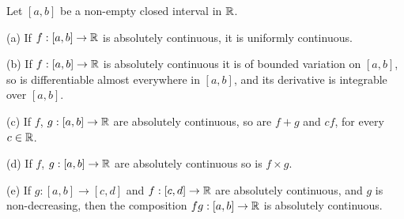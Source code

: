  Let $[a,b]$ be a non-empty closed interval in
$\Bbb R$.

(a) If $f:[a,b]\to\Bbb R$ is absolutely continuous, it is uniformly
continuous.

(b) If $f:[a,b]\to\Bbb R$ is absolutely continuous it is of bounded
variation on $[a,b]$, so is differentiable almost everywhere in $[a,b]$,
and its derivative is integrable over $[a,b]$.

(c) If $f$, $g:[a,b]\to\Bbb R$ are absolutely continuous, so are
$f+g$ and $cf$, for every $c\in\Bbb R$.

(d) If $f$, $g:[a,b]\to\Bbb R$ are absolutely continuous so is $f\times
g$.

(e) If $g:[a,b]\to [c,d]$ and $f:[c,d]\to\Bbb R$ are absolutely
continuous, and $g$ is non-decreasing, then the composition
$fg:[a,b]\to\Bbb R$ is absolutely continuous.

